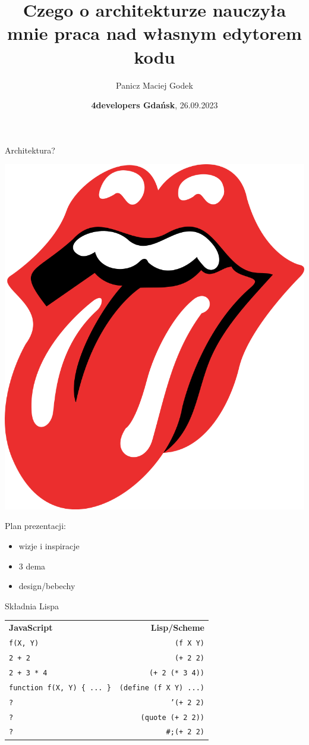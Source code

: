 \documentclass{beamer}
\title{\textbf{Czego o architekturze nauczyła mnie praca nad własnym edytorem kodu}}
\author{Panicz Maciej Godek}
\institute{
  \tiny{\href{mailto:godek.maciek@gmail.com}{\textbf{godek.maciek@gmail.com}}} 
}
\date{\textbf{4developers Gdańsk}, 26.09.2023}
\begin{document}
\begin{frame}
  \titlepage
\end{frame}

\begin{frame}{Architektura?}
  \begin{center}
    \includegraphics[height=0.7\paperheight]{jenzyk.png}
    \end{center}
\end{frame}

\begin{frame}{Plan prezentacji:}
  \begin{itemize}\pause
  \item wizje i inspiracje\pause
  \item 3 dema\pause
  \item design/bebechy
  \end{itemize}
\end{frame}

\begin{frame}{Składnia Lispa}
  \begin{tabular}{ l r }
    \textbf{JavaScript} & \textbf{Lisp/Scheme} \\ \pause
    \texttt{f(X, Y)} & \texttt{(f X Y)} \\ \pause
    \texttt{2 + 2} & \texttt{(+ 2 2)} \\ \pause
    \texttt{2 + 3 * 4} & \texttt{(+ 2 (* 3 4))} \\ \pause
    \texttt{function f(X, Y) \{ ... \}} & \texttt{(define (f X Y) ...)} \\ \pause
    \texttt{?} & \texttt{'(+ 2 2)} \\ \pause
    \texttt{?} & \texttt{(quote (+ 2 2))} \\ \pause
    \texttt{?} & \texttt{\#;(+ 2 2)}
  \end{tabular}
\end{frame}
\end{document}
